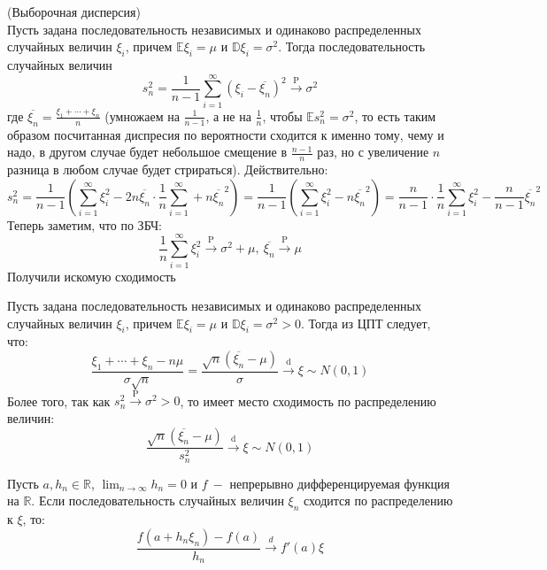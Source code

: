 \begin{example}(Выборочная дисперсия)\\
Пусть задана последовательность независимых и одинаково распределенных случайных величин $\xi_i$, причем $ \mathbb{E}  \xi_i = \mu$ и $ \mathbb{D} \xi_i = \sigma^ 2$. Тогда последовательность случайных величин
$$s_n ^ 2 = \frac1{n-1} \sum_{i = 1}^{\infty} \left(\xi_i - \overline{\xi_n}\right) ^ 2 \xrightarrow{\text{P}} \sigma ^ 2$$
где $\overline{\xi_n} = \frac{\xi_1 + \cdots+ \xi_n}{n}$ (умножаем на $\frac1{n-1}$, а не на $\frac1n$, чтобы $ \mathbb{E}  s_n ^ 2 = \sigma ^ 2$, то есть таким образом посчитанная диспресия по вероятности сходится к именно тому, чему и надо, в другом случае будет небольшое смещение в $\frac{n - 1}{n}$ раз, но с увеличение $n$ разница в любом случае будет стрираться). Действительно:
$$s_n ^ 2 = \frac1{n - 1} \left(\sum_{i = 1}^{\infty} \xi_i ^ 2 - 2 n\overline{\xi_n} \cdot \frac1n \sum_{i = 1}^{\infty} + n \overline{\xi_n} ^ 2\right) = \frac1{n - 1} \left(\sum_{i = 1}^{\infty} \xi_i ^ 2 - n \overline{\xi_n} ^ 2\right) = \frac{n}{n - 1} \cdot \frac1n \sum_{i = 1}^{\infty} \xi_i ^ 2 - \frac{n}{n - 1} \overline{\xi_n} ^ 2$$
Теперь заметим, что по ЗБЧ:
$$\frac1n \sum_{i = 1}^{\infty} \xi_i ^ 2 \xrightarrow{\text{P}} \sigma ^ 2 + \mu, \ \overline{\xi_{n}} \xrightarrow{\text{P}} \mu$$
Получили искомую сходимость
\end{example}

\begin{example}
Пусть задана последовательность независимых и одинаково распределенных случайных величин $\xi_i$, причем $ \mathbb{E}  \xi_i = \mu$ и $ \mathbb{D} \xi_i = \sigma ^ 2 > 0$. Тогда из ЦПТ следует, что:
$$\frac{\xi_1 + \cdots + \xi_n- n \mu}{\sigma \sqrt{n}} = \frac{\sqrt{n}\left(\overline{\xi_n} - \mu\right)}{\sigma} \xrightarrow{\text{d}} \xi \sim N\left(0, 1\right)$$
Более того, так как $s_n ^ 2 \xrightarrow{\text{P}} \sigma ^ 2 > 0$, то имеет место сходимость по распределению величин:
$$\frac{\sqrt{n}\left(\overline{\xi_n} - \mu\right)}{s_n ^ 2} \xrightarrow{\text{d}} \xi \sim N\left(0, 1\right)$$

\end{example}

\begin{advice}
Пусть $a, h_n \in \mathbb{R}$, $\lim_{n \to \infty} h_n = 0$ и $f \ -$ непрерывно дифференцируемая функция на $\mathbb{R}$.
Если последовательность случайных величин $\xi_n$ сходится по распределению к $\xi$, то:
\[
    \frac{f\left(a + h_n \xi_n\right) - f\left(a\right)}{h_n} \xrightarrow{d} f'\left(a\right) \xi
\]
\end{advice}

